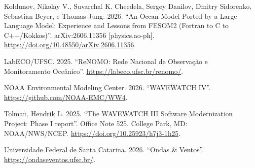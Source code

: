 \documentclass[10pt,a4paper,]{article}
\newlength{\cslhangindent}
\newenvironment{CSLReferences}[2] %
 {\small\begin{list}{}{%
  \setlength{\itemindent}{0pt}
  \setlength{\leftmargin}{0pt}
  \setlength{\parsep}{0pt}
  \ifodd #1
   \setlength{\leftmargin}{\cslhangindent}
   \setlength{\itemindent}{-1\cslhangindent}
  \fi
  \setlength{\itemsep}{#2\baselineskip}}}
 {\end{list}}
\begin{document}
\begin{CSLReferences}{1}{0}
Koldunov, Nikolay V., Suvarchal K. Cheedela, Sergey Danilov, Dmitry
Sidorenko, Sebastian Beyer, e Thomas Jung. 2026. {``An Ocean Model
Ported by a Large Language Model: Experience and Lessons from {FESOM2}
({Fortran} to {C} to {C++/Kokkos})''}. arXiv:2606.11356
{[}physics.ao-ph{]}. \url{https://doi.org/10.48550/arXiv.2606.11356}.

LabECO/UFSC. 2025. {``{ReNOMO}: Rede Nacional de Observação e
Monitoramento Oceânico''}. \url{https://labeco.ufsc.br/renomo/}.

NOAA Environmental Modeling Center. 2026. {``{WAVEWATCH IV}''}.
\url{https://github.com/NOAA-EMC/WW4}.

Tolman, Hendrik L. 2025. {``The {WAVEWATCH III} Software Modernization
Project: Phase {I} report''}. Office Note 525. College Park, MD:
NOAA/NWS/NCEP. \url{https://doi.org/10.25923/h7j3-1h25}.

Universidade Federal de Santa Catarina. 2026. {``Ondas \& Ventos''}.
\url{https://ondaseventos.ufsc.br/}.

\end{CSLReferences}
\end{document}
